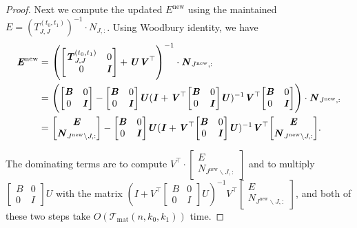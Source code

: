 \documentclass[11pt]{article}
\newcommand{\Tmat}{\mathcal{T}_{\mathrm{mat}}}
\newcommand{\new}{\mathrm{new}}
\let\originalleft\left
\let\originalright\right
\renewcommand{\left}{\mathopen{}\mathclose\bgroup\originalleft}
\renewcommand{\right}{\aftergroup\egroup\originalright}
\newcommand\BB{\boldsymbol{\mathit{B}}}
\newcommand\EE{\boldsymbol{\mathit{E}}}
\newcommand\II{\boldsymbol{\mathit{I}}}
\newcommand\NN{\boldsymbol{\mathit{N}}}
\newcommand\TT{\boldsymbol{\mathit{T}}}
\newcommand\UU{\boldsymbol{\mathit{U}}}
\newcommand\VV{\boldsymbol{\mathit{V}}}
\begin{document}
\begin{proof}
Next we compute the updated $\EE^{\new}$ using the maintained $\EE = (\TT^{(t_0,t_1)}_{J,J})^{-1} \cdot \NN_{J,:}$. Using Woodbury identity, we have
\begin{align}\label{eq:E_new}
\EE^{\new} = &~ \left( \begin{bmatrix}
\TT^{(t_0,t_1)}_{J,J} & 0 \\
0 & \II
\end{bmatrix} + \UU \VV^{\top} \right)^{-1} \cdot \NN_{J^{\new},:} \notag \\
= &~ \left( \begin{bmatrix}
\BB & 0 \\
0 & \II
\end{bmatrix} - \begin{bmatrix}
\BB & 0 \\
0 & \II
\end{bmatrix} \UU (\II + \VV^{\top} \begin{bmatrix}
\BB & 0 \\
0 & \II
\end{bmatrix} \UU)^{-1} \VV^{\top} \begin{bmatrix}
\BB & 0 \\
0 & \II
\end{bmatrix} \right) \cdot \NN_{J^{\new},:} \notag \\
= &~ \begin{bmatrix}
\EE \\
\NN_{J^{\new} \backslash J,:}
\end{bmatrix} 
- \begin{bmatrix}
\BB & 0 \\
0 & \II
\end{bmatrix} \UU (\II + \VV^{\top} \begin{bmatrix}
\BB & 0 \\
0 & \II
\end{bmatrix} \UU)^{-1} \VV^{\top} \begin{bmatrix}
\EE \\
\NN_{J^{\new}\backslash J,:}
\end{bmatrix}.
\end{align}

The dominating terms are to compute $\VV^{\top} \cdot \begin{bmatrix}
\EE \\
\NN_{J^{\new}\backslash J,:}
\end{bmatrix}$ and to multiply $\begin{bmatrix}
\BB & 0 \\
0 & \II
\end{bmatrix} \UU$ with the matrix 
$(\II + \VV^{\top} \begin{bmatrix}
\BB & 0 \\
0 & \II
\end{bmatrix} \UU)^{-1} \VV^{\top} \begin{bmatrix}
\EE \\
\NN_{J^{\new}\backslash J,:}
\end{bmatrix}$, and both of these two steps take $O(\Tmat(n,k_0,k_1))$ time.


\end{proof}
\end{document}
